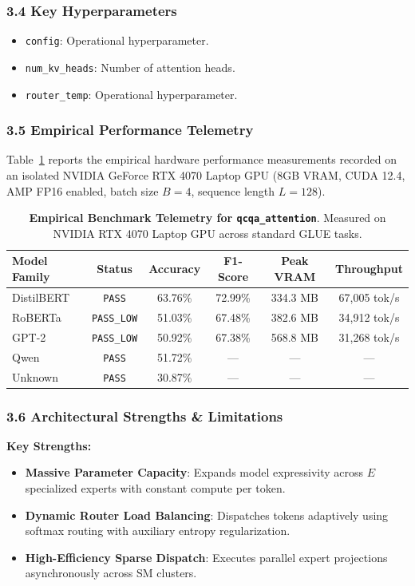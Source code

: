 \subsubsection*{3.4 Key Hyperparameters}
\begin{itemize}
    \item \texttt{config}: Operational hyperparameter.
    \item \texttt{num\_kv\_heads}: Number of attention heads.
    \item \texttt{router\_temp}: Operational hyperparameter.
\end{itemize}

\subsubsection*{3.5 Empirical Performance Telemetry}
Table~\ref{tab:telemetry_qcqa_attention} reports the empirical hardware performance measurements recorded on an isolated NVIDIA GeForce RTX 4070 Laptop GPU (8GB VRAM, CUDA 12.4, AMP FP16 enabled, batch size $B=4$, sequence length $L=128$).

\begin{table}[h]
\centering
\small
\caption{\textbf{Empirical Benchmark Telemetry for \texttt{qcqa\_attention}}. Measured on NVIDIA RTX 4070 Laptop GPU across standard GLUE tasks.}
\label{tab:telemetry_qcqa_attention}
\begin{tabular*}{\columnwidth}{@{\extracolsep{\fill}}lccccc}
\toprule
\textbf{Model Family} & \textbf{Status} & \textbf{Accuracy} & \textbf{F1-Score} & \textbf{Peak VRAM} & \textbf{Throughput} \\
\midrule
DistilBERT & \texttt{PASS} & 63.76\% & 72.99\% & 334.3 MB & 67,005 tok/s \\
RoBERTa & \texttt{PASS\_LOW} & 51.03\% & 67.48\% & 382.6 MB & 34,912 tok/s \\
GPT-2 & \texttt{PASS\_LOW} & 50.92\% & 67.38\% & 568.8 MB & 31,268 tok/s \\
Qwen & \texttt{PASS} & 51.72\% & --- & --- & --- \\
Unknown & \texttt{PASS} & 30.87\% & --- & --- & --- \\
\bottomrule
\end{tabular*}
\end{table}

\subsubsection*{3.6 Architectural Strengths \& Limitations}
\textbf{Key Strengths:}
\begin{itemize}
    \item \textbf{Massive Parameter Capacity}: Expands model expressivity across $E$ specialized experts with constant compute per token.
    \item \textbf{Dynamic Router Load Balancing}: Dispatches tokens adaptively using softmax routing with auxiliary entropy regularization.
    \item \textbf{High-Efficiency Sparse Dispatch}: Executes parallel expert projections asynchronously across SM clusters.
\end{itemize}

